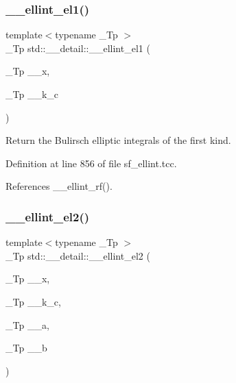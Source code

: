 \mbox{\label{namespacestd_1_1____detail_aa17b1b382a89552f49fbb8c5eda1d50f}} 
\subsubsection{\texorpdfstring{\+\_\+\+\_\+ellint\+\_\+el1()}{\_\_ellint\_el1()}}
{\footnotesize\ttfamily template$<$typename \+\_\+\+Tp $>$ \\
\+\_\+\+Tp std\+::\+\_\+\+\_\+detail\+::\+\_\+\+\_\+ellint\+\_\+el1 (\begin{DoxyParamCaption}\item[{\+\_\+\+Tp}]{\+\_\+\+\_\+x,  }\item[{\+\_\+\+Tp}]{\+\_\+\+\_\+k\+\_\+c }\end{DoxyParamCaption})}

Return the Bulirsch elliptic integrals of the first kind. 

Definition at line 856 of file sf\+\_\+ellint.\+tcc.



References \+\_\+\+\_\+ellint\+\_\+rf().

\mbox{\label{namespacestd_1_1____detail_a82449d0f05d40ba2cef6b8fc57dd5bae}} 
\subsubsection{\texorpdfstring{\+\_\+\+\_\+ellint\+\_\+el2()}{\_\_ellint\_el2()}}
{\footnotesize\ttfamily template$<$typename \+\_\+\+Tp $>$ \\
\+\_\+\+Tp std\+::\+\_\+\+\_\+detail\+::\+\_\+\+\_\+ellint\+\_\+el2 (\begin{DoxyParamCaption}\item[{\+\_\+\+Tp}]{\+\_\+\+\_\+x,  }\item[{\+\_\+\+Tp}]{\+\_\+\+\_\+k\+\_\+c,  }\item[{\+\_\+\+Tp}]{\+\_\+\+\_\+a,  }\item[{\+\_\+\+Tp}]{\+\_\+\+\_\+b }\end{DoxyParamCaption})}

